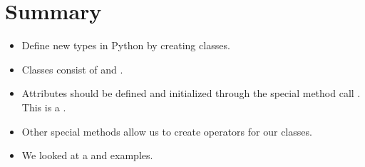 \documentclass[letterpaper,10pt,english]{sphinxmanual}
\begin{document}
\section{Summary}
\label{\detokenize{lecture_notes/lec18_classes1:summary}}\begin{itemize}
\item {} 
Define new types in Python by creating classes.

\item {} 
Classes consist of  and .

\item {} 
Attributes should be defined and initialized through the special
method call . This is a .

\item {} 
Other special methods allow us to create operators for our classes.

\item {} 
We looked at a  and  examples.

\end{itemize}
\end{document}

